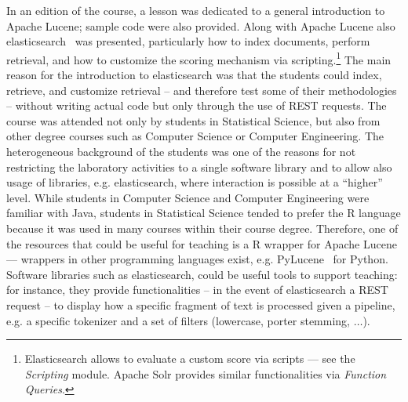 In an edition of the course, a lesson was dedicated to a general introduction to Apache Lucene; sample code were also provided. Along with Apache Lucene also elasticsearch~\cite{elasticsearch} was presented, particularly how to index documents, perform retrieval, and how to customize the scoring mechanism via scripting.\footnote{Elasticsearch allows to evaluate a custom score via scripts --- see the {\em Scripting} module. Apache Solr provides similar functionalities via {\em Function Queries}.} The main reason for the introduction to elasticsearch was that the students could index, retrieve, and customize retrieval -- and therefore test some of their methodologies -- without writing actual code but only through the use of REST requests.
The course was attended not only by students in Statistical Science, but also from other degree courses such as Computer Science or Computer Engineering.
The heterogeneous background of the students was one of the reasons for not restricting the laboratory activities to a single software library and to allow also usage of libraries, e.g. elasticsearch, where interaction is possible at a ``higher'' level.
While students in Computer Science and Computer Engineering were familiar with Java, students in Statistical Science tended to prefer the R language because it was used in many courses within their course degree. Therefore, one of the resources that could be useful for teaching is a R wrapper for Apache Lucene --- wrappers in other programming languages exist, e.g. PyLucene~\cite{PyLucene} for Python.
Software libraries such as elasticsearch, could be useful tools to support teaching: for instance, they provide functionalities -- in the event of elasticsearch a REST request -- to display how a specific fragment of text is processed given a pipeline, e.g. a specific tokenizer and a set of filters (lowercase, porter stemming, $\dots$).


